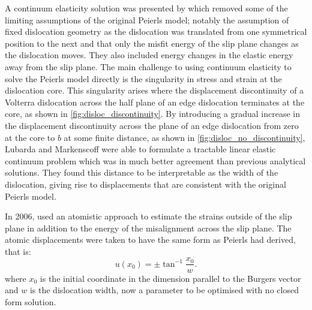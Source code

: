 A continuum elasticity solution was presented by \citet{Lubarda2007} which removed some of the limiting assumptions of the original Peierls model; notably the assumption of fixed dislocation geometry as the dislocation was translated from one symmetrical position to the next and that only the misfit energy of the slip plane changes as the dislocation moves. They also included energy changes in the elastic energy away from the slip plane. The main challenge to using continuum elasticity to solve the Peierls model directly is the singularity in stress and strain at the dislocation core. This singularity arises where the displacement discontinuity of a Volterra dislocation across the half plane of an edge dislocation terminates at the core, as shown in \autoref{fig:disloc_discontinuity}. By introducing a gradual increase in the displacement discontinuity across the plane of an edge dislocation from zero at the core to $b$ at some finite distance, as shown in \autoref{fig:disloc_no_discontinuity}, Lubarda and Markenscoff were able to formulate a tractable linear elastic continuum problem which was in much better agreement than previous analytical solutions. They found this distance to be interpretable as the width of the dislocation, giving rise to displacements that are consistent with the original Peierls model. 



In 2006, \citet{Clegg2006} used an atomistic approach to estimate the strains outside of the slip plane in addition to the energy of the misalignment across the slip plane. The atomic displacements were taken to have the same form as Peierls had derived, that is:
\begin{equation}
u(x_0) = \pm \tan^{-1}\frac{x_0}{w}.
\end{equation}
where $x_0$ is the initial coordinate in the dimension parallel to the Burgers vector and $w$ is the dislocation width, now a parameter to be optimised with no closed form solution. 

